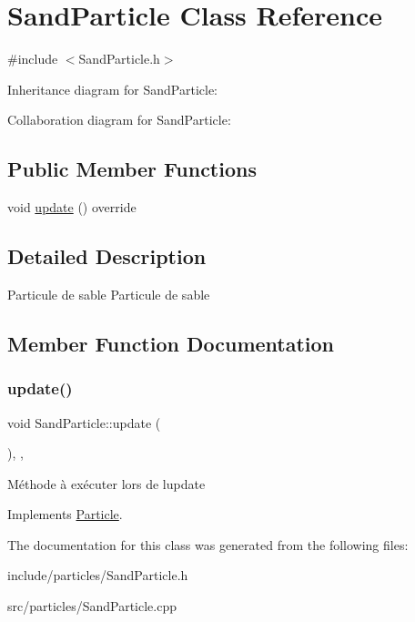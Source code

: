 \hypertarget{classSandParticle}{}\section{Sand\+Particle Class Reference}
\label{classSandParticle}


{\ttfamily \#include $<$Sand\+Particle.\+h$>$}



Inheritance diagram for Sand\+Particle\+:


Collaboration diagram for Sand\+Particle\+:
\subsection*{Public Member Functions}
\begin{DoxyCompactItemize}
\item 
void \hyperlink{classSandParticle_a5efef5e3f7995f30bdde7264401f03d2}{update} () override
\end{DoxyCompactItemize}


\subsection{Detailed Description}
Particule de sable Particule de sable 

\subsection{Member Function Documentation}
\mbox{\label{classSandParticle_a5efef5e3f7995f30bdde7264401f03d2}} 
\subsubsection{\texorpdfstring{update()}{update()}}
{\footnotesize\ttfamily void Sand\+Particle\+::update (\begin{DoxyParamCaption}{ }\end{DoxyParamCaption})\hspace{0.3cm}{\ttfamily [inline]}, {\ttfamily [override]}, {\ttfamily [virtual]}}

Méthode à exécuter lors de l\textquotesingle{}update 

Implements \hyperlink{classParticle_a9bb57d8a1b761970315ca01c52c717b1}{Particle}.



The documentation for this class was generated from the following files\+:\begin{DoxyCompactItemize}
\item 
include/particles/Sand\+Particle.\+h\item 
src/particles/Sand\+Particle.\+cpp\end{DoxyCompactItemize}
